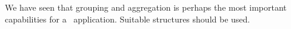 We have seen that grouping and aggregation is perhaps the most important capabilities for a \bd~application. Suitable structures should be used.




